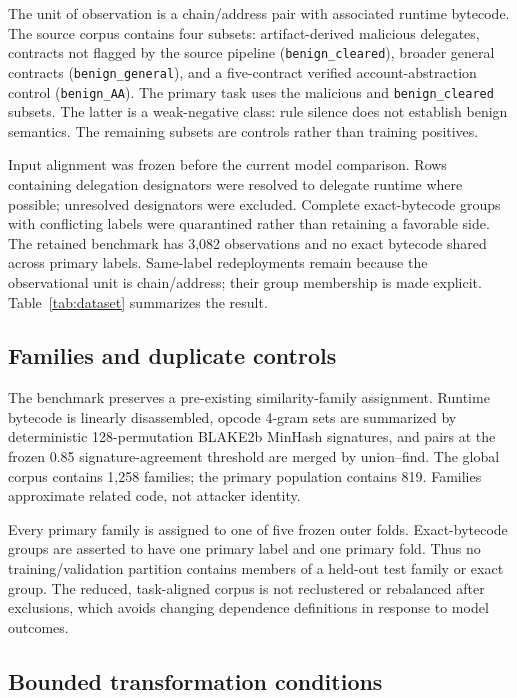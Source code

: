 \documentclass[conference]{IEEEtran}
\newcommand{\bclear}{\texttt{benign\_cleared}}
\newcommand{\bgen}{\texttt{benign\_general}}
\newcommand{\baa}{\texttt{benign\_AA}}
\begin{document}
The unit of observation is a chain/address pair with associated runtime bytecode. The source
corpus contains four subsets: artifact-derived malicious delegates, contracts not flagged by the
source pipeline (\bclear), broader general contracts (\bgen), and a five-contract verified
account-abstraction control (\baa). The primary task uses the malicious and \bclear{} subsets.
The latter is a weak-negative class: rule silence does not establish benign semantics. The
remaining subsets are controls rather than training positives.

Input alignment was frozen before the current model comparison. Rows containing delegation
designators were resolved to delegate runtime where possible; unresolved designators were
excluded. Complete exact-bytecode groups with conflicting labels were quarantined rather than
retaining a favorable side. The retained benchmark has 3,082 observations and no exact bytecode
shared across primary labels. Same-label redeployments remain because the observational unit is
chain/address; their group membership is made explicit. Table~\ref{tab:dataset} summarizes the
result.



\subsection{Families and duplicate controls}

The benchmark preserves a pre-existing similarity-family assignment. Runtime bytecode is
linearly disassembled, opcode 4-gram sets are summarized by deterministic 128-permutation BLAKE2b
MinHash signatures, and pairs at the frozen 0.85 signature-agreement threshold are merged by
union--find. The global corpus contains 1,258 families; the primary population contains 819.
Families approximate related code, not attacker identity.

Every primary family is assigned to one of five frozen outer folds. Exact-bytecode groups are
asserted to have one primary label and one primary fold. Thus no training/validation partition
contains members of a held-out test family or exact group. The reduced, task-aligned corpus is not
reclustered or rebalanced after exclusions, which avoids changing dependence definitions in
response to model outcomes.

\subsection{Bounded transformation conditions}
\end{document}
